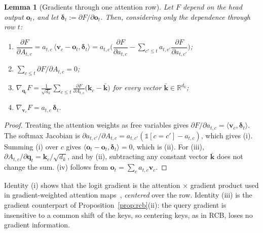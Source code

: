 \documentclass{article}
\newtheorem{lemma}[theorem]{Lemma}
\begin{document}
\begin{lemma}[Gradients through one attention row]\label{lem:attn_grad}
Let $F$ depend on the head output $\mathbf{o}_t$, and let $\boldsymbol{\delta}_t := \partial F / \partial \mathbf{o}_t$. Then, considering only the dependence through row $t$:
\begin{enumerate}
    \item[(i)] $\dfrac{\partial F}{\partial A_{t,c}} = a_{t,c}\, \langle \mathbf{v}_c - \mathbf{o}_t, \boldsymbol{\delta}_t \rangle = a_{t,c} \Big( \dfrac{\partial F}{\partial a_{t,c}} - \sum_{c' \le t} a_{t,c'} \dfrac{\partial F}{\partial a_{t,c'}} \Big)$;
    \item[(ii)] $\sum_{c \le t} \partial F / \partial A_{t,c} = 0$;
    \item[(iii)] $\nabla_{\mathbf{q}_t} F = \frac{1}{\sqrt{d_k}} \sum_{c \le t} \frac{\partial F}{\partial A_{t,c}} \big( \mathbf{k}_c - \bar{\mathbf{k}} \big)$ for \emph{every} vector $\bar{\mathbf{k}} \in \mathbb{R}^{d_k}$;
    \item[(iv)] $\nabla_{\mathbf{v}_c} F = a_{t,c}\, \boldsymbol{\delta}_t$.
\end{enumerate}
\end{lemma}

\begin{proof}
Treating the attention weights as free variables gives $\partial F / \partial a_{t,c} = \langle \mathbf{v}_c, \boldsymbol{\delta}_t \rangle$. The softmax Jacobian is $\partial a_{t,c'} / \partial A_{t,c} = a_{t,c'}(\mathbb{1}[c = c'] - a_{t,c})$, which gives (i). Summing (i) over $c$ gives $\langle \mathbf{o}_t - \mathbf{o}_t, \boldsymbol{\delta}_t \rangle = 0$, which is (ii). For (iii), $\partial A_{t,c} / \partial \mathbf{q}_t = \mathbf{k}_c / \sqrt{d_k}$, and by (ii), subtracting any constant vector $\bar{\mathbf{k}}$ does not change the sum. (iv) follows from $\mathbf{o}_t = \sum_c a_{t,c} \mathbf{v}_c$.
\end{proof}

Identity (i) shows that the logit gradient is the attention $\times$ gradient product used in gradient-weighted attention maps~\cite{chefer2021transformer}, \emph{centered} over the row. Identity (iii) is the gradient counterpart of Proposition~\ref{prop:rcb}(ii): the query gradient is insensitive to a common shift of the keys, so centering keys, as in RCB, loses no gradient information.
\end{document}
